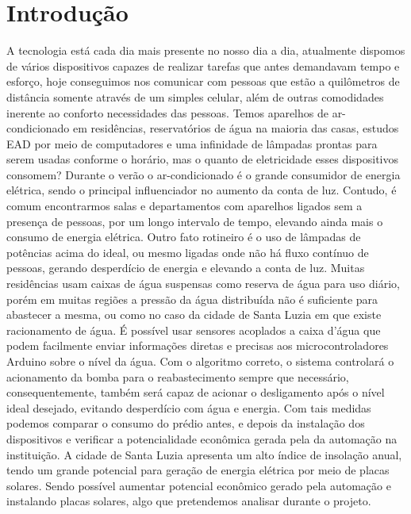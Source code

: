 \section{Introdução}
A tecnologia está cada dia mais presente no nosso dia a dia, atualmente dispomos de vários dispositivos capazes de realizar tarefas que antes demandavam tempo e esforço, hoje conseguimos nos comunicar com pessoas que estão a quilômetros de distância somente através de um simples celular, além de outras comodidades inerente ao conforto necessidades das pessoas. Temos aparelhos de ar- condicionado em residências, reservatórios de água na maioria das casas, estudos EAD por meio de computadores e uma infinidade de lâmpadas prontas para serem usadas conforme o horário, mas o quanto de eletricidade esses dispositivos consomem? Durante o verão o ar-condicionado é o grande consumidor de energia elétrica, sendo o principal influenciador no aumento da conta de luz. Contudo, é comum encontrarmos salas e departamentos com aparelhos ligados sem a presença de pessoas, por um longo intervalo de tempo, elevando ainda mais o consumo de energia elétrica. Outro fato rotineiro é o uso de lâmpadas de potências acima do ideal, ou mesmo ligadas onde não há fluxo contínuo de pessoas, gerando desperdício de energia e elevando a conta de luz. Muitas residências usam caixas de água suspensas como reserva de água para uso diário, porém em muitas regiões a pressão da água distribuída não é suficiente para abastecer a mesma, ou como no caso da cidade de Santa Luzia em que existe racionamento de água. É possível usar sensores acoplados a caixa d’água que podem facilmente enviar informações diretas e precisas aos microcontroladores Arduino sobre o nível da água. Com o algoritmo correto, o sistema controlará o acionamento da bomba para o reabastecimento sempre que necessário, consequentemente, também será capaz de acionar o desligamento após o nível ideal desejado, evitando desperdício com água e energia. Com tais medidas podemos comparar o consumo do prédio antes, e depois da instalação dos dispositivos e verificar a potencialidade econômica gerada pela da automação na instituição. A cidade de Santa Luzia apresenta um alto índice de insolação anual, tendo um grande potencial para geração de energia elétrica por meio de placas solares. Sendo possível aumentar potencial econômico gerado pela automação e instalando placas solares, algo que pretendemos analisar durante o projeto.